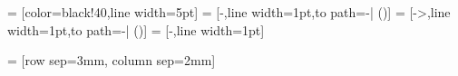  = [color=black!40,line width=5pt]
 = [-,line width=1pt,to path={-| (\tikztotarget)}]
 = [->,line width=1pt,to path={-| (\tikztotarget)}]
 = [-,line width=1pt]


 = [row sep=3mm, column sep=2mm]



\newcommand{\MultilineComponent}[2]
{
	\begin{minipage}{#1}
	\begin{center}
		#2
	\end{center}
	\end{minipage}
}

\newcommand{\TwolineComponent}[3]
{
	\begin{minipage}{#1}
	\begin{center}
		#2 \linebreak #3
	\end{center}
	\end{minipage}
}

\newcommand{\ThreelineComponent}[4]
{
	\begin{minipage}{#1}
	\begin{center}
		#2 \linebreak #3 \linebreak #4
	\end{center}
	\end{minipage}
}

\newcommand{\MultiColumnComponent}[5]
{
	\begin{minipage}{#1}
	\begin{center}
	#2 \linebreak #3
	\end{center}
	\begin{minipage}{0.49\textwidth}
	\begin{center}
	#4
	\end{center}
	\end{minipage}
	\begin{minipage}{0.49\textwidth}
	\begin{center}
	#5
	\end{center}
	\end{minipage}
	\end{minipage}
}

\def\arraystretch{1.3}
